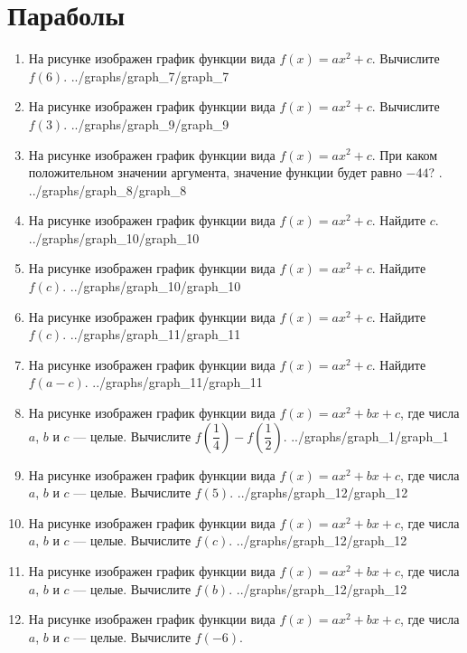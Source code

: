 \documentclass[10pt, a4paper]{article}
\begin{document}
\section{Параболы}
\begin{enumerate}
	\item \funcexer
		{На рисунке изображен график функции вида $f(x)=ax^2+c$. Вычислите $f(6)$. }
		{../graphs/graph_7/graph_7}
	\item \funcexer
		{На рисунке изображен график функции вида $f(x)=ax^2+c$. Вычислите $f(3)$. }
		{../graphs/graph_9/graph_9}
	\item \funcexer
		{На рисунке изображен график функции вида $f(x)=ax^2+c$. При каком положительном значении аргумента, значение функции будет равно $-44$? .}
		{../graphs/graph_8/graph_8}
	\item \funcexer
		{На рисунке изображен график функции вида $f(x)=ax^2+c$. Найдите $c$. }
		{../graphs/graph_10/graph_10}
	\item \funcexer
		{На рисунке изображен график функции вида $f(x)=ax^2+c$. Найдите $f(c)$. }
		{../graphs/graph_10/graph_10}
	\item \funcexer
		{На рисунке изображен график функции вида $f(x)=ax^2+c$. Найдите $f(c)$. }
		{../graphs/graph_11/graph_11}
	\item \funcexer
		{На рисунке изображен график функции вида $f(x)=ax^2+c$. Найдите $f(a-c)$. }
		{../graphs/graph_11/graph_11}
	\item \funcexer
		{На рисунке изображен график функции вида $f(x)=ax^2+bx+c$, где числа $a$, $b$ и $c$ — целые. Вычислите $f\left(\dfrac{1}{4}\right)-f\left(\dfrac{1}{2}\right)$. }
		{../graphs/graph_1/graph_1}
	\item \funcexer
		{На рисунке изображен график функции вида $f(x)=ax^2+bx+c$, где числа $a$, $b$ и $c$ — целые. Вычислите $f(5)$. }
		{../graphs/graph_12/graph_12}
	\item \funcexer
		{На рисунке изображен график функции вида $f(x)=ax^2+bx+c$, где числа $a$, $b$ и $c$ — целые. Вычислите $f(c)$. }
		{../graphs/graph_12/graph_12}
	\item \funcexer
		{На рисунке изображен график функции вида $f(x)=ax^2+bx+c$, где числа $a$, $b$ и $c$ — целые. Вычислите $f(b)$. }
		{../graphs/graph_12/graph_12}
	\item \funcexer
		{На рисунке изображен график функции вида $f(x)=ax^2+bx+c$, где числа $a$, $b$ и $c$ — целые. Вычислите $f(-6)$. }

\end{enumerate}
\end{document}
